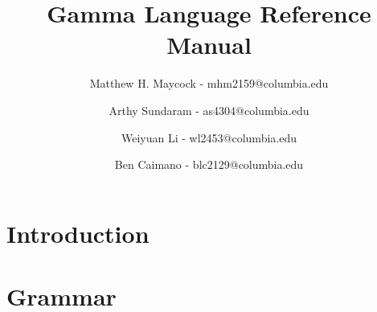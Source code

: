 
\title{Gamma Language Reference Manual}
\author{
	Matthew H. Maycock - mhm2159@columbia.edu
	\and Arthy Sundaram - as4304@columbia.edu
	\and Weiyuan Li - wl2453@columbia.edu
	\and Ben Caimano - blc2129@columbia.edu
}


\newcommand{\Lang}{GAMMA}
\newcommand{\Compiler}{ray}



\maketitle

\pagebreak

\tableofcontents

\pagebreak

\section{Introduction}


\section{Grammar}



